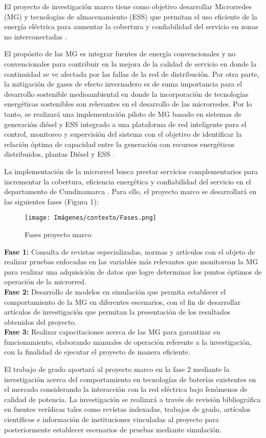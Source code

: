 El proyecto de investigación marco tiene como objetivo desarrollar Microrredes (MG) y tecnologías de almacenamiento (ESS) que permitan el uso eficiente de la energía eléctrica  para aumentar la cobertura y confiabilidad del servicio en zonas no interconectadas \cite{microgrid}.

El propósito de las MG es integrar fuentes de energía convencionales y no convencionales para contribuir en la mejora de la calidad de servicio en donde la continuidad se ve afectada por las fallas de la red de distribución. Por otra parte, la mitigación de gases de efecto invernadero es de suma importancia para el desarrollo sostenible medioambiental en donde la incorporación de tecnologías energéticas sostenibles son relevantes en el desarrollo de las microrredes. Por lo tanto, se realizará una implementación  piloto de MG basado en sistemas de generación diésel y ESS integrado a una plataforma de red inteligente para el control, monitoreo y supervisión del sistema con el objetivo de identificar la relación óptima de capacidad entre la generación con recursos energéticos distribuidos, plantas Diésel y ESS   \cite{microgrid}.

La implementación de la microrred busca prestar servicios complementarios para incrementar la cobertura, eficiencia energética y confiabilidad del servicio en el departamento de Cundinamarca \cite{microgrid}. Para ello, el proyecto marco se desarrollará en las siguientes fases (Figura 1):
\newpage
\begin{figure}[h!]
    \begin{center}
    \centering
    \texttt{[image: Imágenes/contexto/Fases.png]}
	\caption{ Fases proyecto marco}
    \end{center}
\end{figure}

\textbf{Fase 1: } Consulta de revistas especializadas, normas y artículos con el objeto de realizar pruebas enfocadas en las variables más relevantes que monitorean la MG para realizar una adquisición de datos que logre determinar los puntos óptimos de operación de la microrred.\\

\textbf{Fase 2: } Desarrollo de  modelos en simulación que permita establecer el comportamiento de la MG en diferentes escenarios, con el fin de desarrollar  artículos de investigación que permitan la presentación de los resultados obtenidos del proyecto.\\

\textbf{Fase 3: } Realizar capacitaciones acerca de las MG para garantizar su funcionamiento,  elaborando manuales de operación referente a la investigación, con la finalidad de ejecutar el proyecto de manera eficiente.


El trabajo de grado aportará al proyecto marco en la fase 2 mediante la investigación acerca del comportamiento en tecnologías de baterías existentes en el mercado considerando la  interacción con la red eléctrica bajo fenómenos de calidad de potencia. La investigación se realizará a través de revisión bibliográfica en fuentes verídicas tales como revistas indexadas, trabajos de grado, artículos científicos e información de instituciones vinculadas al proyecto para posteriormente establecer escenarios de pruebas mediante simulación.